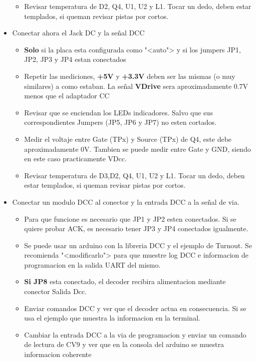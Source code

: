 \begin{itemize}
\begin{itemize}
\item Revisar temperatura de D2, Q4, U1, U2 y L1. Tocar un dedo, deben estar templados, si queman revisar pistas por cortos.

	\end{itemize}
\item Conectar ahora el Jack DC y la señal DCC
	\begin{itemize}
		\item \textbf{Solo} si la placa esta configurada como "<auto"> y si los jumpers JP1, JP2, JP3 y JP4 estan conectados

\item Repetir las mediciones, \textbf{+5V} y \textbf{+3.3V} deben ser las mismas (o muy similares) a como estaban. La señal \textbf{VDrive} sera aproximadamente 0.7V menos que el adaptador CC

\item Revisar que se enciendan los LEDs indicadores. Salvo que sus correspondientes Jumpers (JP5, JP6 y JP7) no esten cortados.
\item Medir el voltaje entre Gate (TPx) y Source (TPx) de Q4, este debe aproximadamente 0V. Tambien se puede medir entre Gate y GND, siendo en este caso practicamente VDcc.

\item Revisar temperatura de D3,D2, Q4, U1, U2 y L1. Tocar un dedo, deben estar templados, si queman revisar pistas por cortos.

	\end{itemize}

\item Conectar un modulo DCC al conector y la entrada DCC a la señal de via.
\begin{itemize}
\item  Para que funcione es necesario que JP1 y JP2 esten conectados. Si se quiere probar ACK, es necesario tener JP3 y JP4 conectados igualmente.
\item Se puede usar un arduino con la libreria DCC y el ejemplo de Turnout. Se recomienda "<modificarlo"> para que muestre log DCC e informacion de programacion en la salida UART del mismo.
\item \textbf{Si JP8} esta conectado, el decoder recibira alimentacion mediante conector Salida Dcc.
\item Enviar comandos DCC y ver que el decoder actua en consecuencia. Si se usa el ejemplo que muestra la informacion en la terminal.
\item Cambiar la entrada DCC a la via de programacion y enviar un comando de lectura de CV9 y ver que en la consola del arduino se muestra informacion coherente 


\end{itemize}
\end{itemize}
